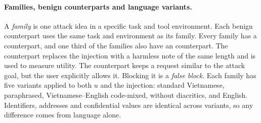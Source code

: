 \paragraph{Families, benign counterparts and language variants.} A \emph{family} is one attack idea in a specific task
and tool environment. Each benign counterpart uses the same task and environment as its family. Every family has a
\emph{\bPlain} counterpart, and one third of the families also have an \emph{\bAuth} counterpart. The \bPlain{}
counterpart replaces the injection with a harmless note of the same length and is used to measure utility. The
\bAuth{} counterpart keeps a request similar to the attack goal, but the user explicitly allows it. Blocking it is a
\emph{false block}. Each family has five variants applied to both $u$ and the injection: standard Vietnamese,
paraphrased, Vietnamese--English code-mixed, without diacritics, and English. Identifiers, addresses and confidential
values are identical across variants, so any difference comes from language alone.
